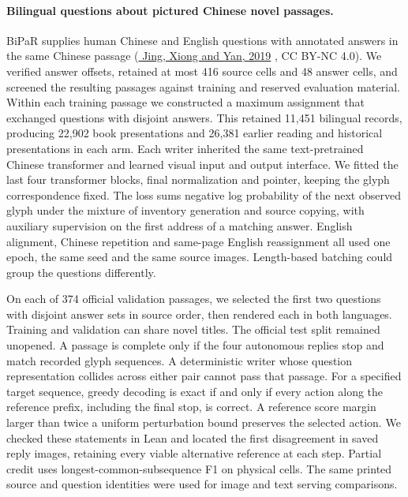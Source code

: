 \documentclass[12pt,a4paper]{article}
\providecommand{\DIFadd}[1]{{\protect\color{blue} \sf #1}} %
\begin{document}
\paragraph{\DIFadd{Bilingual questions about pictured Chinese novel passages.}}
\DIFadd{BiPaR supplies human Chinese and English questions with annotated answers in the same Chinese passage (}\href{https://aclanthology.org/D19-1249/}{\DIFadd{Jing, Xiong and Yan, 2019}}\DIFadd{, CC BY-NC 4.0). We verified answer offsets, retained at most 416 source cells and 48 answer cells, and screened the resulting passages against training and reserved evaluation material. Within each training passage we constructed a maximum assignment that exchanged questions with disjoint answers. This retained 11,451 bilingual records, producing 22,902 book presentations and 26,381 earlier reading and historical presentations in each arm. Each writer inherited the same text-pretrained Chinese transformer and learned visual input and output interface. We fitted the last four transformer blocks, final normalization and pointer, keeping the glyph correspondence fixed. The loss sums negative log probability of the next observed glyph under the mixture of inventory generation and source copying, with auxiliary supervision on the first address of a matching answer. English alignment, Chinese repetition and same-page English reassignment all used one epoch, the same seed and the same source images. Length-based batching could group the questions differently.
}

\DIFadd{On each of 374 official validation passages, we selected the first two questions with disjoint answer sets in source order, then rendered each in both languages. Training and validation can share novel titles. The official test split remained unopened. A passage is complete only if the four autonomous replies stop and match recorded glyph sequences. A deterministic writer whose question representation collides across either pair cannot pass that passage. For a specified target sequence, greedy decoding is exact if and only if every action along the reference prefix, including the final stop, is correct. A reference score margin larger than twice a uniform perturbation bound preserves the selected action. We checked these statements in Lean and located the first disagreement in saved reply images, retaining every viable alternative reference at each step. Partial credit uses longest-common-subsequence F1 on physical cells. The same printed source and question identities were used for image and text serving comparisons.
}
\end{document}
